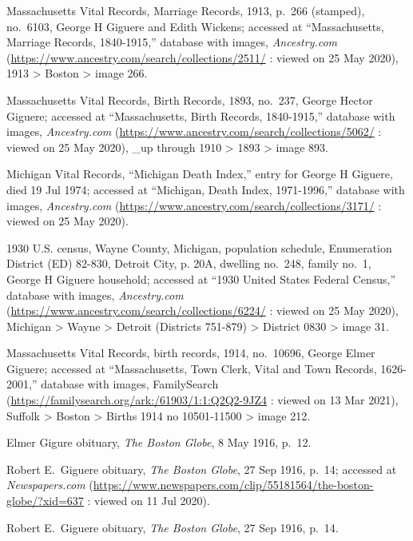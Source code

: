\begin{thebibliography}{999}
Massachusetts Vital Records, Marriage Records, 1913, p.\ 266 (stamped), no.\ 6103, George H Giguere and Edith Wickens; accessed at ``Massachusetts, Marriage Records, 1840-1915,'' database with images, \textit{Ancestry.com} (\url{https://www.ancestry.com/search/collections/2511/} : viewed on 25 May 2020), 1913 > Boston > image 266.

Massachusetts Vital Records, Birth Records, 1893, no.\  237, George Hector Giguere; accessed at ``Massachusetts, Birth Records, 1840-1915,'' database with images, \textit{Ancestry.com} (\url{https://www.ancestry.com/search/collections/5062/} : viewed on 25 May 2020), \_up through 1910 > 1893 > image 893.

Michigan Vital Records, ``Michigan Death Index,'' entry for George H Giguere, died 19 Jul 1974; accessed at ``Michigan, Death Index, 1971-1996,'' database with images, \textit{Ancestry.com} (\url{https://www.ancestry.com/search/collections/3171/} : viewed on 25 May 2020).

1930 U.S. census, Wayne County, Michigan, population schedule, Enumeration District (ED) 82-830, Detroit City, p. 20A, dwelling no.\ 248, family no.\ 1, George H Giguere household; accessed at ``1930 United States Federal Census,'' database with images, \textit{Ancestry.com} (\url{https://www.ancestry.com/search/collections/6224/} : viewed on 25 May 2020), Michigan > Wayne > Detroit (Districts 751-879) > District 0830 > image 31.

Massachusetts Vital Records, birth records, 1914, no.\ 10696, George Elmer Giguere; accessed at ``Massachusetts, Town Clerk, Vital and Town Records, 1626-2001,'' database with images, FamilySearch (\url{https://familysearch.org/ark:/61903/1:1:Q2Q2-9JZ4} : viewed on 13 Mar 2021), Suffolk > Boston > Births 1914 no 10501-11500 > image 212.

Elmer Gigure obituary, \textit{The Boston Globe}, 8 May 1916, p.\ 12.
	
Robert E.\ Giguere obituary, \textit{The Boston Globe}, 27 Sep 1916, p.\ 14; accessed at \textit{Newspapers.com} (\url{https://www.newspapers.com/clip/55181564/the-boston-globe/?xid=637} : viewed on 11 Jul 2020).

Robert E.\ Giguere obituary, \textit{The Boston Globe}, 27 Sep 1916, p.\ 14.


\end{thebibliography}
